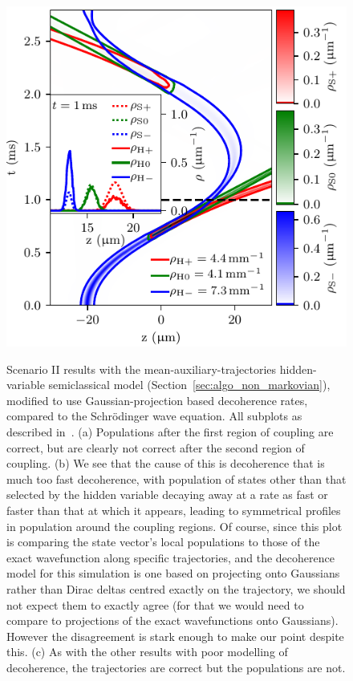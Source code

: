 {\begin{figure}
{    \includegraphics{figures/hidden_variables/hvsc_aux_mirror_very_bad_gamma/trajectories.pdf}
    }
    \caption{Scenario II results with the mean-auxiliary-trajectories hidden-variable semiclassical model (Section~\ref{sec:algo_non_markovian}), modified to use Gaussian-projection based decoherence rates, compared to the Schr\"odinger wave equation. All subplots as described in~. (a) Populations after the first region of coupling are correct, but are clearly not correct after the second region of coupling. (b) We see that the cause of this is decoherence that is much too fast decoherence, with population of states other than that selected by the hidden variable decaying away at a rate as fast or faster than that at which it appears, leading to symmetrical profiles in population around the coupling regions. Of course, since this plot is comparing the state vector's local populations to those of the exact wavefunction along specific trajectories, and the decoherence model for this simulation is one based on projecting onto Gaussians rather than Dirac deltas centred exactly on the trajectory, we should not expect them to exactly agree (for that we would need to compare to projections of the exact wavefunctions onto Gaussians). However the disagreement is stark enough to make our point despite this. (c) As with the other results with poor modelling of decoherence, the trajectories are correct but the populations are not.}\label{fig:very_bad_gamma}
\end{figure}
\restoregeometry}

